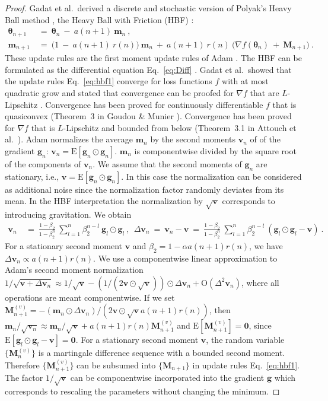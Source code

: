 \documentclass{article}
\newcommand\Bg{\bm{g}}
\newcommand\Bm{\bm{m}}
\newcommand\Bv{\bm{v}}
\newcommand\BM{\bm{M}}
\newcommand\Bth{\bm{\theta}}
\newcommand\BZe{\bm{0}}
\newcommand{\rE}{\mathrm{E}} \newcommand{\rF}{\mathrm{F}}
\newcommand{\rO}{\mathrm{O}} \newcommand{\rP}{\mathrm{P}}
\begin{document}
\begin{proof}
Gadat et al.\ derived a discrete and stochastic
version of Polyak's Heavy Ball method \cite{Polyak:64},
the Heavy Ball with Friction (HBF) \cite{Gadat:16}:
\begin{align}
\label{eq:hbf1}
\Bth_{n+1} \ &= \ \Bth_n \ - \ a(n+1) \ \Bm_n \ , \\ \nonumber
\Bm_{n+1} \ &= \ \big( 1 \ - \  a(n+1) \ r(n) \big) \ \Bm_n \ + \  a(n+1) \ r(n) \
\big( \nabla f(\Bth_n) \ + \ \BM_{n+1} \big) \ .
\end{align}
These update rules are the first moment update rules
of Adam \cite{Kingma:14}.
The HBF can be formulated as the differential equation
Eq.~\eqref{eq:Diff} \cite{Gadat:16}.
Gadat et al.\ showed that the update rules
Eq.~\eqref{eq:hbf1} converge
for loss functions $f$ with at most quadratic grow and
stated that convergence can be proofed
for $\nabla f$ that are $L$-Lipschitz \cite{Gadat:16}.
Convergence has been proved for continuously differentiable $f$ that
is quasiconvex (Theorem~3 in Goudou \& Munier \cite{Goudou:09}).
Convergence has been proved for $\nabla f$ that is $L$-Lipschitz and
bounded from below (Theorem~3.1 in Attouch et al.\ \cite{Attouch:00}).
Adam normalizes the average $\Bm_n$ by the second moments $\Bv_n$ of
of the gradient $\Bg_n$: $\Bv_n=\rE \left[ \Bg_n \odot \Bg_n\right]$.
$\Bm_n$ is componentwise divided by the square root of
the components of $\Bv_n$.
We assume that the second moments of $\Bg_n$ are stationary,
i.e., $\Bv=\rE \left[ \Bg_n \odot \Bg_n\right]$.
In this case the normalization can be considered as additional noise
since the normalization factor randomly deviates from its mean.
In the HBF interpretation the normalization by $\sqrt{\Bv}$
corresponds to introducing gravitation.
We obtain
\begin{align}
\Bv_n \ &= \ \frac{1  -  \beta_2}{1  - \beta_2^n} \ \sum_{l=1}^{n}
        \beta_2^{n-l} \ \Bg_l \odot \Bg_l \ , \ \
\Delta \Bv_n \ = \  \Bv_n - \Bv \ = \
\frac{1  - \beta_2}{1  - \beta_2^n} \  \sum_{l=1}^{n}
        \beta_2^{n-l} \ \left( \Bg_l \odot \Bg_l - \Bv \right) \ .
\end{align}
For a stationary second moment $\Bv$ and $\beta_2=1-\alpha a(n+1)r(n)$, we have
$\Delta \Bv_n \propto a(n+1)r(n)$.
We use a componentwise
linear approximation to Adam's second moment normalization
$1/\sqrt{\Bv+\Delta \Bv_n} \approx 1/\sqrt{\Bv} - (1/(2 \Bv \odot
\sqrt{\Bv}))  \odot \Delta \Bv_n
+ \rO(\Delta^2 \Bv_n)$, where all operations are meant componentwise.
If we set $\BM_{n+1}^{(v)}=- (\Bm_n \odot \Delta \Bv_n)/(2 \Bv \odot
\sqrt{\Bv}a(n+1)r(n))$, then $\Bm_n / \sqrt{\Bv_n} \approx \Bm_n / \sqrt{\Bv} +
a(n+1)r(n)\BM_{n+1}^{(v)}$ and
$\rE \left[\BM_{n+1}^{(v)} \right] = \BZe$, since $\rE \left[\Bg_l \odot \Bg_l - \Bv \right] = \BZe$.
For a stationary second moment $\Bv$, the random variable $\{\BM^{(v)}_n\}$ is a martingale
difference sequence with a bounded second moment.
Therefore $\{\BM^{(v)}_{n+1}\}$ can be subsumed into  $\{\BM_{n+1}\}$ in update
rules Eq.~\eqref{eq:hbf1}. The factor $1 / \sqrt{\Bv}$ can be componentwise
incorporated into the gradient $\Bg$ which corresponds to rescaling
the parameters without changing the minimum.
\end{proof}
\end{document}
